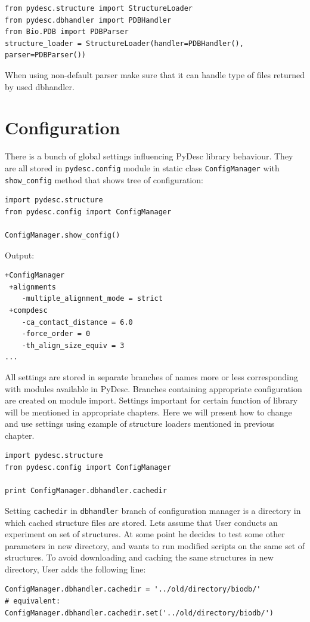 \documentclass{article}
\begin{document}
\begin{lstlisting}
from pydesc.structure import StructureLoader
from pydesc.dbhandler import PDBHandler
from Bio.PDB import PDBParser
structure_loader = StructureLoader(handler=PDBHandler(), parser=PDBParser())
\end{lstlisting}

    When using non-default parser make sure that it can handle type of files returned by used dbhandler.


\section{Configuration} \label{CONFIGsec}

There is a bunch of global settings influencing PyDesc library behaviour. They are all stored in \texttt{pydesc.config} module in static class \texttt{ConfigManager} with \texttt{show\_{}config} method that shows tree of configuration:

\begin{lstlisting}
import pydesc.structure
from pydesc.config import ConfigManager

ConfigManager.show_config()
\end{lstlisting}
Output:
\begin{lstlisting}
+ConfigManager
 +alignments
	-multiple_alignment_mode = strict
 +compdesc
	-ca_contact_distance = 6.0
	-force_order = 0
	-th_align_size_equiv = 3
...
\end{lstlisting}

All settings are stored in separate branches of names more or less corresponding with modules available in PyDesc. Branches containing appropriate configuration are created on module import. Settings important for certain function of library will be mentioned in appropriate chapters. Here we will present how to change and use settings using ezample of structure loaders mentioned in previous chapter.

\begin{lstlisting}
import pydesc.structure
from pydesc.config import ConfigManager

print ConfigManager.dbhandler.cachedir
\end{lstlisting}

Setting \texttt{cachedir} in \texttt{dbhandler} branch of configuration manager is a directory in which cached structure files are stored. Lets assume that User conducts an experiment on set of structures. At some point he decides to test some other parameters in new directory, and wants to run modified scripts on the same set of structures. To avoid downloading and caching the same structures in new directory, User adds the following line:
\begin{lstlisting}
ConfigManager.dbhandler.cachedir = '../old/directory/biodb/'
# equivalent:
ConfigManager.dbhandler.cachedir.set('../old/directory/biodb/')
\end{lstlisting}
\end{document}
